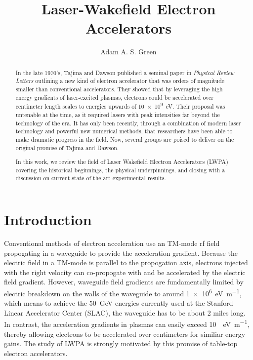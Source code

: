 \documentclass[12pt,letter]{article}
\title{Laser-Wakefield Electron Accelerators}
\author{Adam A. S. Green}
\begin{document}

\maketitle
\doublespacing
\strictpagecheck

\begin{abstract}
    In the late 1970's, Tajima and Dawson published a seminal paper in {\em
    Physical Review Letters} outlining a new kind of electron
    accelerator that was orders of magnitude smaller than conventional accelerators. They showed that by
    leveraging the high energy gradients of
    laser-excited plasmas, electrons could be accelerated over centimeter length scales to energies upwards of
    \SI{10e9}{\electronvolt}. Their proposal was untenable at the time, as it
    required lasers with peak intensities far beyond the technology of the era.
    It has only been recently, through a combination of modern laser technology and powerful new
    numerical methods, that researchers have been able to make dramatic
    progress in the field. Now, several groups are poised to deliver on the
    original promise of Tajima and Dawson.
    
    In this work, we review the field of Laser Wakefield Electron Accelerators
    (LWPA) covering the historical beginnings, the physical underpinnings,
    and closing with a discussion on current state-of-the-art
    experimental results. 

  \end{abstract}
\tableofcontents
\section{Introduction}
\label{sec:intro}
Conventional methods of electron acceleration use an TM-mode rf field
propogating in a
waveguide to provide the acceleration gradient. Because the electric field in a TM-mode is parallel to the propogation axis,
electrons injected with the right velocity can co-propogate with and be accelerated by the
electric field gradient.  However, waveguide field gradients are
fundamentally limited by electric breakdown on the walls of the waveguide to
around
\SI{1e6}{\electronvolt\per\meter}\cite{}, which means to achieve the
\SI{50}{\giga\electronvolt} energies currently used at the Stanford Linear
Accelerator Center (SLAC), the waveguide has to be about 2 miles long. In contrast, the
acceleration gradients in plasmas can easily exceed \SI{10}{\giga
\electronvolt\per\meter}, thereby allowing electrons to be accelerated over centimeters
for similiar energy gains.\cite{}
The study of LWPA is strongly motivated by this promise of table-top electron
accelerators.   
\end{document}
